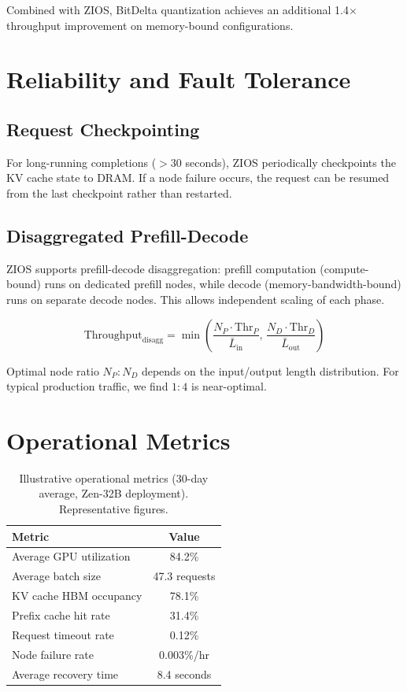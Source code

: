 \documentclass[11pt,a4paper]{article}
\begin{document}
Combined with ZIOS, BitDelta quantization achieves an additional 1.4$\times$ throughput improvement on memory-bound configurations.

\section{Reliability and Fault Tolerance}

\subsection{Request Checkpointing}

For long-running completions ($>$30 seconds), ZIOS periodically checkpoints the KV cache state to DRAM. If a node failure occurs, the request can be resumed from the last checkpoint rather than restarted.

\subsection{Disaggregated Prefill-Decode}

ZIOS supports prefill-decode disaggregation: prefill computation (compute-bound) runs on dedicated prefill nodes, while decode (memory-bandwidth-bound) runs on separate decode nodes. This allows independent scaling of each phase.

\begin{equation}
\text{Throughput}_{\text{disagg}} = \min\!\left(\frac{N_P \cdot \text{Thr}_P}{\bar{L}_{\text{in}}},\, \frac{N_D \cdot \text{Thr}_D}{\bar{L}_{\text{out}}}\right)
\end{equation}

Optimal node ratio $N_P : N_D$ depends on the input/output length distribution. For typical production traffic, we find $1:4$ is near-optimal.

\section{Operational Metrics}

\begin{table}[H]
\centering
\caption{Illustrative operational metrics (30-day average, Zen-32B deployment). Representative figures.}
\label{tab:ops}
\begin{tabular}{lc}
\toprule
Metric & Value \\
\midrule
Average GPU utilization & 84.2\% \\
Average batch size & 47.3 requests \\
KV cache HBM occupancy & 78.1\% \\
Prefix cache hit rate & 31.4\% \\
Request timeout rate & 0.12\% \\
Node failure rate & 0.003\%/hr \\
Average recovery time & 8.4 seconds \\
\bottomrule
\end{tabular}
\end{table}
\end{document}
